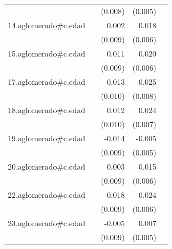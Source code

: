 {\begin{longtable}{l*{4}{D{.}{.}{-1}}}
            &                     &     (0.008)         &     (0.005)         &                     \\
\addlinespace
14.aglomerado#c.edad&                     &       0.002         &       0.018\sym{**} &                     \\
            &                     &     (0.009)         &     (0.006)         &                     \\
\addlinespace
15.aglomerado#c.edad&                     &       0.011         &       0.020\sym{***}&                     \\
            &                     &     (0.009)         &     (0.006)         &                     \\
\addlinespace
17.aglomerado#c.edad&                     &       0.013         &       0.025\sym{**} &                     \\
            &                     &     (0.010)         &     (0.008)         &                     \\
\addlinespace
18.aglomerado#c.edad&                     &       0.012         &       0.024\sym{**} &                     \\
            &                     &     (0.010)         &     (0.007)         &                     \\
\addlinespace
19.aglomerado#c.edad&                     &      -0.014         &      -0.005         &                     \\
            &                     &     (0.009)         &     (0.005)         &                     \\
\addlinespace
20.aglomerado#c.edad&                     &       0.003         &       0.015\sym{*}  &                     \\
            &                     &     (0.009)         &     (0.006)         &                     \\
\addlinespace
22.aglomerado#c.edad&                     &       0.018\sym{*}  &       0.024\sym{***}&                     \\
            &                     &     (0.009)         &     (0.006)         &                     \\
\addlinespace
23.aglomerado#c.edad&                     &      -0.005         &       0.007         &                     \\
            &                     &     (0.009)         &     (0.005)         &                     \\

\end{longtable}}
